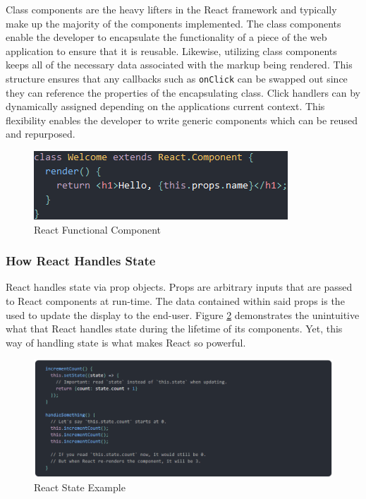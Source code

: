 \documentclass[12pt]{article}
\begin{document}
Class components are the heavy lifters in the React framework and typically make up the majority of the components implemented. The class components enable the developer to encapsulate the functionality of a piece of the web application to ensure that it is reusable. Likewise, utilizing class components keeps all of the necessary data associated with the markup being rendered. This structure ensures that any callbacks such as \texttt{onClick} can be swapped out since they can reference the properties of the encapsulating class. Click handlers can by dynamically assigned depending on the applications current context. This flexibility enables the developer to write generic components which can be reused and repurposed.

\begin{figure}[h]
	\centering
	\includegraphics[scale=0.7]{react_class_component}
	\caption{React Functional Component}
	\label{fig:reactclasscomponent}
\end{figure}

\subsubsection{How React Handles State}

React handles state via prop objects. Props are arbitrary inputs that are passed to React components at run-time. The data contained within said props is the used to update the display to the end-user. Figure \ref{fig:reactstateexample} demonstrates the unintuitive what that React handles state during the lifetime of its components. Yet, this way of handling state is what makes React so powerful.

\begin{figure}[h]
	\centering
	\includegraphics[scale=0.5]{react_state_example}
	\caption{React State Example}
	\label{fig:reactstateexample}
\end{figure}
\end{document}
